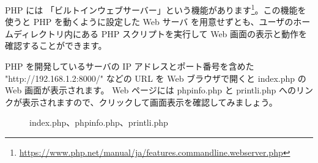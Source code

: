 \documentclass[mingoth,a4paper]{jsarticle}
\begin{document}
PHP には 「ビルトインウェブサーバー」という機能があります\footnote{\url{https://www.php.net/manual/ja/features.commandline.webserver.php}}。この機能を使うと PHP を動くように設定した Web サーバ を用意せずとも、ユーザのホームディレクトリ内にある PHP スクリプトを実行して Web 画面の表示と動作を確認することができます。


PHP を開発しているサーバの IP アドレスとポート番号を含めた "http://192.168.1.2:8000/"
などの URL を Web ブラウザで開くと index.php の Web 画面が表示されます。
Web ページには phpinfo.php と printli.php へのリンクが表示されますので、クリックして画面表示を確認してみましょう。

\begin{center}
  \begin{figure}[htbp]
    \caption{index.php、phpinfo.php、printli.php}
  \end{figure}
\end{center}
\end{document}
